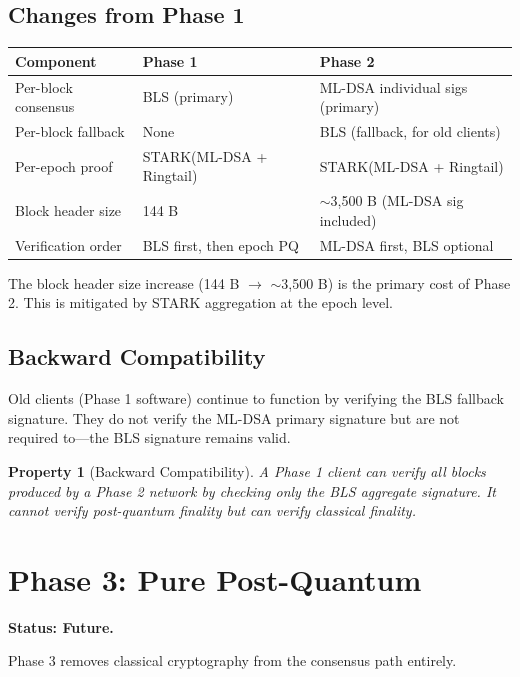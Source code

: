 \documentclass[11pt,a4paper]{article}
\newtheorem{property}{Property}[section]
\begin{document}
\subsection{Changes from Phase 1}

\begin{center}
\begin{tabular}{lll}
\toprule
\textbf{Component} & \textbf{Phase 1} & \textbf{Phase 2} \\
\midrule
Per-block consensus & BLS (primary) & ML-DSA individual sigs (primary) \\
Per-block fallback & None & BLS (fallback, for old clients) \\
Per-epoch proof & STARK(ML-DSA + Ringtail) & STARK(ML-DSA + Ringtail) \\
Block header size & 144 B & $\sim$3,500 B (ML-DSA sig included) \\
Verification order & BLS first, then epoch PQ & ML-DSA first, BLS optional \\
\bottomrule
\end{tabular}
\end{center}

The block header size increase (144 B $\to$ $\sim$3,500 B) is the primary cost of Phase 2. This is mitigated by STARK aggregation at the epoch level.

\subsection{Backward Compatibility}

Old clients (Phase 1 software) continue to function by verifying the BLS fallback signature. They do not verify the ML-DSA primary signature but are not required to---the BLS signature remains valid.

\begin{property}[Backward Compatibility]
A Phase 1 client can verify all blocks produced by a Phase 2 network by checking only the BLS aggregate signature. It cannot verify post-quantum finality but can verify classical finality.
\end{property}

\section{Phase 3: Pure Post-Quantum}

\textbf{Status: Future.}

Phase 3 removes classical cryptography from the consensus path entirely.
\end{document}
